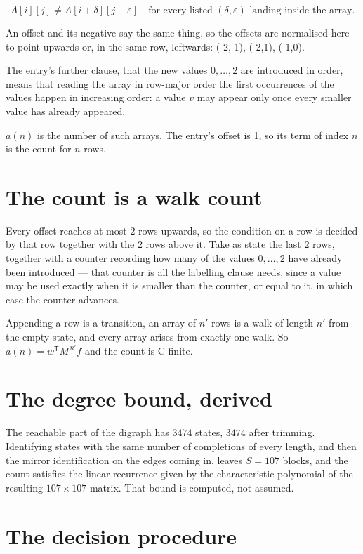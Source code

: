 \documentclass[11pt]{article}
\theoremstyle{definition}
\begin{document}
\[A[i][j] \ne A[i{+}\delta][j{+}\varepsilon]\quad\text{for every listed }(\delta,\varepsilon)\text{ landing inside the array.}\]

An offset and its negative say the same thing, so the offsets are normalised here to point upwards or, in the same row, leftwards: (-2,-1), (-2,1), (-1,0).

The entry's further clause, that the new values $0,\dots,2$ are introduced in order, means that reading the array in row-major order the first occurrences of the values happen in increasing order: a value $v$ may appear only once every smaller value has already appeared.

$a(n)$ is the number of such arrays. The entry's offset is 1, so its term of index $n$ is the count for $n$ rows.

\section{The count is a walk count}

Every offset reaches at most $2$ rows upwards, so the condition on a row is decided by that row together with the $2$ rows above it. Take as state the last $2$ rows, together with a counter recording how many of the values $0,\dots,2$ have already been introduced --- that counter is all the labelling clause needs, since a value may be used exactly when it is smaller than the counter, or equal to it, in which case the counter advances.

Appending a row is a transition, an array of $n'$ rows is a walk of length $n'$ from the empty state, and every array arises from exactly one walk. So $a(n) = w^{\mathsf T}M^{\,n'}f$ and the count is C-finite.

\section{The degree bound, derived}

The reachable part of the digraph has $3474$ states, $3474$ after trimming. Identifying states with the same number of completions of every length, and then the mirror identification on the edges coming in, leaves $S = 107$ blocks, and the count satisfies the linear recurrence given by the characteristic polynomial of the resulting $107\times107$ matrix. That bound is computed, not assumed.

\section{The decision procedure}
\end{document}
